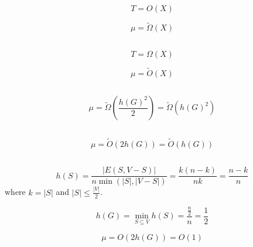 \documentclass[a4paper,11pt,oneside,onecolumn]{article}
\begin{document}
\section{}

\section{}

\subsection{}

$$
T = O(X)
$$

$$
\mu = \tilde\Omega(X)
$$

\subsection{}

$$
T = \Omega(X)
$$

$$
\mu = \tilde O(X)
$$

\subsection{}

$$
\mu = \tilde\Omega\left(\frac{h(G)^2}{2}\right) = \tilde\Omega\left(h(G)^2\right)
$$

\subsection{}

$$
\mu = \tilde O\left(2 h(G) \right) = \tilde O\left( h(G) \right)
$$

\subsection{}

\subsubsection{}

$$
h(S) = \frac{|E(S,V-S)|}{n \min\left(|S|,|V-S|\right)} = \frac{k(n-k)}{nk} = \frac{n-k}{n}
$$
where $k = |S|$ and $|S| \le \frac{|V|}{2}$.

$$
h(G) = \min_{S\subseteq V} h(S) = \frac{\frac{n}{2}}{n} = \frac{1}{2}
$$

$$
\mu = O\left(2 h(G) \right) = O \left(1\right)
$$
\end{document}

